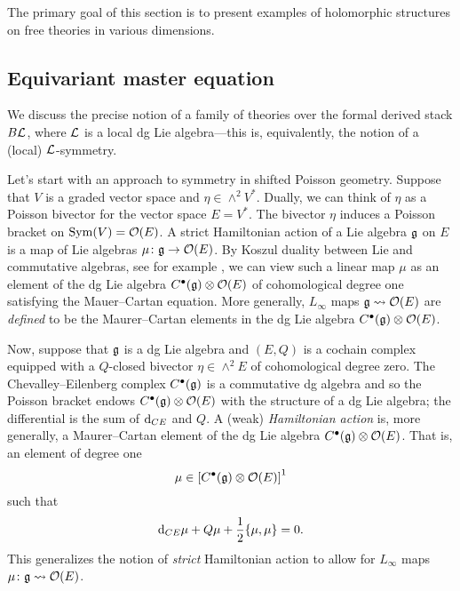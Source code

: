 \documentclass[11pt]{amsart}
\begin{document}
The primary goal of this section is to present examples of holomorphic structures on free theories in various dimensions.

\subsection{Equivariant master equation}

We discuss the precise notion of a family of theories over the formal derived stack $B \mathcal L$, where $\mathcal L$ is a local dg
Lie algebra---this is, equivalently, the notion of a (local) $\mathcal L$-symmetry.

Let's start with an approach to symmetry in shifted Poisson geometry.
Suppose that $V$ is a graded vector space and $\eta \in \wedge^2 V^*$.
Dually, we can think of $\eta$ as a Poisson bivector for the vector space $E = V^*$.
The bivector $\eta$ induces a Poisson bracket on $\operatorname{Sym} (V) = \mathcal O(E)$.
A strict Hamiltonian action of a Lie algebra $\mathfrak{g}$ on $E$ is a map of Lie algebras $\mu \colon \mathfrak{g} \to \mathcal O(E)$.
By Koszul duality between Lie and commutative algebras, see for example \cite{LurieDAGX}, we can view such a linear map $\mu$ as an element of the dg Lie algebra
$C^\bullet(\mathfrak{g}) \otimes \mathcal O(E)$ of cohomological degree one satisfying the Mauer--Cartan equation.
More generally, $L_\infty$ maps $\mathfrak{g} \rightsquigarrow \mathcal O(E)$ are \textit{defined} to be the Maurer--Cartan elements in
the dg Lie algebra $C^\bullet(\mathfrak{g}) \otimes \mathcal O(E)$.

Now, suppose that $\mathfrak{g}$ is a dg Lie algebra and $(E,Q)$ is a cochain complex equipped with a $Q$-closed bivector
$\eta \in \wedge^2 E$ of cohomological degree zero.
The Chevalley--Eilenberg complex $C^\bullet(\mathfrak{g})$ is a commutative dg algebra and so the Poisson bracket endows $C^\bullet(\mathfrak{g}) \otimes \mathcal O(E)$ with the structure of a dg Lie algebra; the differential is the sum of ${\rm d}_{CE}$ and $Q$.
A (weak) \textit{Hamiltonian action} is, more generally, a Maurer--Cartan element of the dg Lie algebra $C^\bullet(\mathfrak{g}) \otimes \mathcal O(E)$.
That is, an element of degree one
\begin{equation}
\mu \in \left[C^\bullet(\mathfrak{g}) \otimes \mathcal O(E)\right]^1
\end{equation}
such that
\begin{equation}
{\rm d}_{CE} \mu + Q \mu + \frac12 \{\mu,\mu\} = 0 .
\end{equation}
This generalizes the notion of \textit{strict} Hamiltonian action to allow for $L_\infty$ maps $\mu \colon \mathfrak{g}
\rightsquigarrow \mathcal O(E)$.
\end{document}
